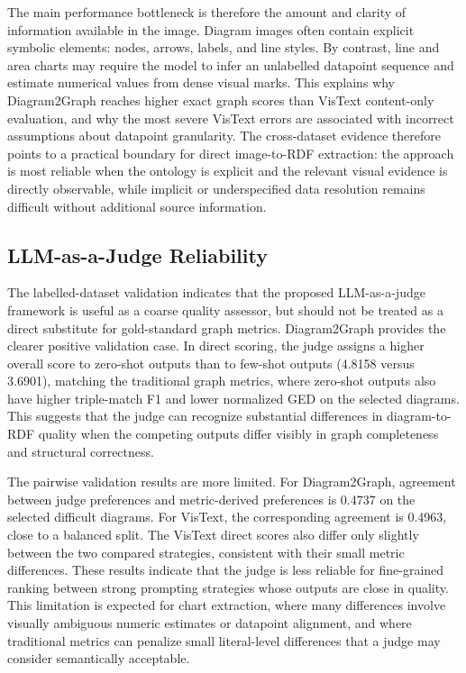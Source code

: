 \documentclass[preprint,12pt]{elsarticle}
\begin{document}
The main performance bottleneck is therefore the amount and clarity of information available in the image. Diagram images
often contain explicit symbolic elements: nodes, arrows, labels, and line
styles. By contrast, line and area charts may require the model to infer an
unlabelled datapoint sequence and estimate numerical values from dense visual
marks. This explains why Diagram2Graph reaches higher exact graph scores than
VisText content-only evaluation, and why the most severe VisText errors are
associated with incorrect assumptions about datapoint granularity. The
cross-dataset evidence therefore points to a practical boundary for direct
image-to-RDF extraction: the approach is most reliable when the ontology is
explicit and the relevant visual evidence is directly observable, while
implicit or underspecified data resolution remains difficult without additional
source information.


\subsection{LLM-as-a-Judge Reliability}\label{sec:judge_reliability}

The labelled-dataset validation indicates that the proposed LLM-as-a-judge
framework is useful as a coarse quality assessor, but should not be treated as a
direct substitute for gold-standard graph metrics. Diagram2Graph provides the
clearer positive validation case. In direct scoring, the judge assigns a higher overall score to zero-shot outputs than to few-shot outputs
(4.8158 versus 3.6901), matching the traditional graph metrics, where zero-shot
outputs also have higher triple-match F1 and lower normalized GED on the
selected diagrams. This suggests that the judge can recognize substantial
differences in diagram-to-RDF quality when the competing outputs differ
visibly in graph completeness and structural correctness.

The pairwise validation results are more limited. For Diagram2Graph, agreement
between judge preferences and metric-derived preferences is 0.4737 on the
selected difficult diagrams. For VisText, the corresponding agreement is
0.4963, close to a balanced split. The VisText direct scores also differ only
slightly between the two compared strategies, consistent with their small
metric differences. These results indicate that the judge is less reliable for
fine-grained ranking between strong prompting strategies whose outputs are
close in quality. This limitation is expected for chart extraction, where many
differences involve visually ambiguous numeric estimates or datapoint
alignment, and where traditional metrics can penalize small literal-level
differences that a judge may consider semantically acceptable.
\end{document}
